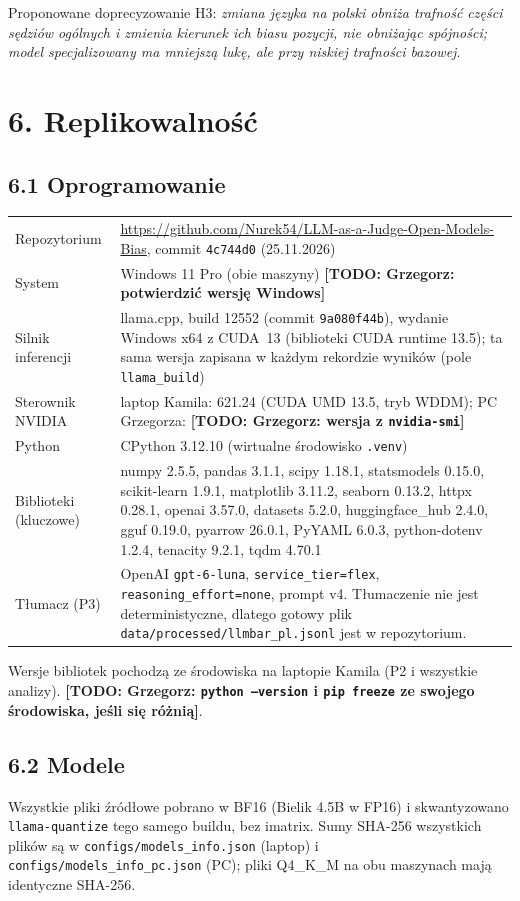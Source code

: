 \documentclass[10pt,a4paper]{article}
\newcommand{\TODO}[1]{{\color{red!75!black}\textbf{[TODO: #1]}}}
\begin{document}
Proponowane doprecyzowanie H3: \emph{zmiana języka na polski obniża trafność części sędziów ogólnych i zmienia kierunek ich biasu pozycji, nie obniżając spójności; model specjalizowany ma mniejszą lukę, ale przy niskiej trafności bazowej}.

\section*{6. Replikowalność}
\subsection*{6.1 Oprogramowanie}
\begin{tabularx}{\linewidth}{@{}L{4.2cm} Y@{}}
\toprule
Repozytorium & \url{https://github.com/Nurek54/LLM-as-a-Judge-Open-Models-Bias}, commit \texttt{4c744d0} (25.11.2026) \\
System & Windows 11 Pro (obie maszyny) \TODO{Grzegorz: potwierdzić wersję Windows} \\
Silnik inferencji & llama.cpp, build 12552 (commit \texttt{9a080f44b}), wydanie Windows x64 z CUDA~13 (biblioteki CUDA runtime 13.5); ta sama wersja zapisana w każdym rekordzie wyników (pole \texttt{llama\_build}) \\
Sterownik NVIDIA & laptop Kamila: 621.24 (CUDA UMD 13.5, tryb WDDM); PC Grzegorza: \TODO{Grzegorz: wersja z \texttt{nvidia-smi}} \\
Python & CPython 3.12.10 (wirtualne środowisko \texttt{.venv}) \\
Biblioteki (kluczowe) & numpy 2.5.5, pandas 3.1.1, scipy 1.18.1, statsmodels 0.15.0, scikit-learn 1.9.1, matplotlib 3.11.2, seaborn 0.13.2, httpx 0.28.1, openai 3.57.0, datasets 5.2.0, huggingface\_hub 2.4.0, gguf 0.19.0, pyarrow 26.0.1, PyYAML 6.0.3, python-dotenv 1.2.4, tenacity 9.2.1, tqdm 4.70.1 \\
Tłumacz (P3) & OpenAI \texttt{gpt-6-luna}, \texttt{service\_tier=flex}, \texttt{reasoning\_effort=none}, prompt v4. Tłumaczenie nie jest deterministyczne, dlatego gotowy plik \texttt{data/processed/llmbar\_pl.jsonl} jest w repozytorium. \\
\bottomrule
\end{tabularx}

Wersje bibliotek pochodzą ze środowiska na laptopie Kamila (P2 i wszystkie analizy). \TODO{Grzegorz: \texttt{python --version} i \texttt{pip freeze} ze swojego środowiska, jeśli się różnią}.

\subsection*{6.2 Modele}
Wszystkie pliki źródłowe pobrano w BF16 (Bielik 4.5B w FP16) i skwantyzowano \texttt{llama-quantize} tego samego buildu, bez imatrix. Sumy SHA-256 wszystkich plików są w \texttt{configs/models\_info.json} (laptop) i \texttt{configs/models\_info\_pc.json} (PC); pliki Q4\_K\_M na obu maszynach mają identyczne SHA-256.
\end{document}

